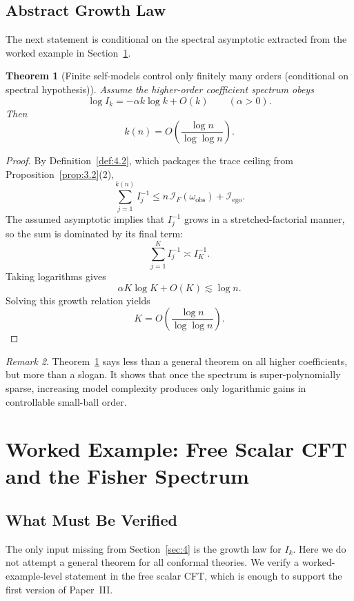 \documentclass[12pt]{article}
\newtheorem{theorem}{Theorem}[section]
\theoremstyle{definition}
\theoremstyle{remark}
\newtheorem{remark}[theorem]{Remark}
\begin{document}
\subsection{Abstract Growth Law}\label{subsec:4.2}

The next statement is conditional on the spectral asymptotic extracted
from the worked example in Section~\ref{sec:5}.

\begin{theorem}[Finite self-models control only finitely many orders
(conditional on spectral hypothesis)]
\label{thm:4.3}
Assume the higher-order coefficient spectrum obeys
\[
\log I_k = -\alpha k\log k + O(k)
\qquad
(\alpha>0).
\]
Then
\[
k(n)
=
O\!\left(\frac{\log n}{\log\log n}\right).
\]
\end{theorem}

\begin{proof}
By Definition~\ref{def:4.2}, which packages the trace ceiling from
Proposition~\ref{prop:3.2}(2),
\[
\sum_{j=1}^{k(n)} I_j^{-1}
\le
n\,\mathcal{I}_F(\omega_{\mathrm{obs}})
+
\mathcal{I}_{\mathrm{ego}}.
\]
The assumed asymptotic implies that \(I_j^{-1}\) grows in a
stretched-factorial manner, so the sum is dominated by its final term:
\[
\sum_{j=1}^{K} I_j^{-1}\asymp I_K^{-1}.
\]
Taking logarithms gives
\[
\alpha K\log K + O(K)
\lesssim
\log n.
\]
Solving this growth relation yields
\[
K = O\!\left(\frac{\log n}{\log\log n}\right).
\]
\end{proof}

\begin{remark}\label{rem:4.4}
Theorem~\ref{thm:4.3} says less than a general theorem on all higher
coefficients, but more than a slogan. It shows that once the spectrum is
super-polynomially sparse, increasing model complexity produces only
logarithmic gains in controllable small-ball order.
\end{remark}

\section{Worked Example: Free Scalar CFT and the Fisher Spectrum}
\label{sec:5}

\subsection{What Must Be Verified}\label{subsec:5.1}

The only input missing from Section~\ref{sec:4} is the growth law for
\(I_k\). Here we do not attempt a general theorem for all conformal
theories. We verify a worked-example-level statement in the free scalar
CFT, which is enough to support the first version of Paper~III.
\end{document}
